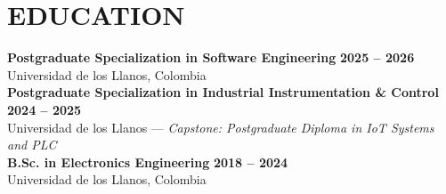 \documentclass[letterpaper,10pt]{article}
\begin{document}
\section{EDUCATION}
\textbf{Postgraduate Specialization in Software Engineering} \hfill \textbf{2025 -- 2026} \\
Universidad de los Llanos, Colombia \\
\textbf{Postgraduate Specialization in Industrial Instrumentation \& Control} \hfill \textbf{2024 -- 2025} \\
Universidad de los Llanos --- \textit{Capstone: Postgraduate Diploma in IoT Systems and PLC} \\
\textbf{B.Sc. in Electronics Engineering} \hfill \textbf{2018 -- 2024} \\
Universidad de los Llanos, Colombia

\end{document}
